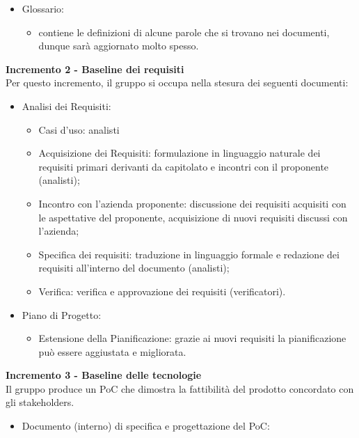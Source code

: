 {{\begin{itemize}
        \item Glossario: 
            \begin{itemize}
                \item contiene le definizioni di alcune parole che si trovano nei documenti, dunque sarà aggiornato molto spesso.
            \end{itemize}
    \end{itemize}
    \textbf{Incremento 2 - Baseline dei requisiti} \\
    Per questo incremento, il gruppo si occupa nella stesura dei seguenti documenti:
    \begin{itemize}
        \item Analisi dei Requisiti:
            \begin{itemize}
                \item Casi d'uso: analisti
                \item Acquisizione dei Requisiti: formulazione in linguaggio naturale dei requisiti primari derivanti da capitolato e incontri con il proponente (analisti);
                \item Incontro con l'azienda proponente: discussione dei requisiti acquisiti con le aspettative del proponente, acquisizione di nuovi requisiti discussi con l'azienda;
                \item Specifica dei requisiti: traduzione in linguaggio formale e redazione dei requisiti all'interno del documento \AdR{} (analisti);
                \item Verifica: verifica e approvazione dei requisiti (verificatori).
            \end{itemize}
    \item Piano di Progetto: 
        \begin{itemize}
            \item Estensione della Pianificazione: grazie ai nuovi requisiti la pianificazione può essere aggiustata e migliorata.
        \end{itemize} 
    \end{itemize}
    \textbf{Incremento 3 - Baseline delle tecnologie} \\
    Il gruppo produce un PoC che dimostra la fattibilità del prodotto concordato con gli stakeholders. \\
    \begin{itemize}
        \item Documento (interno) di specifica e progettazione del PoC:
            \begin{itemize}

\end{itemize}
\end{itemize}}}
